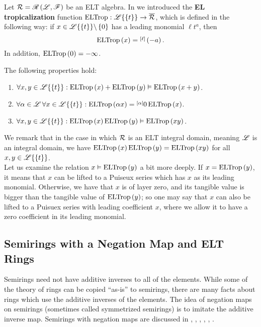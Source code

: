 Let $\mathcal{R}=\mathscr{R}\left(\mathscr{L},\mathscr{F}\right)$ be an ELT algebra. In \cite{BS} we introduced the \textbf{EL tropicalization} function $\textnormal{ELTrop}:\mathscr{L}\{\{t\}\}\rightarrow\overline{\mathcal{R}}$, which is defined in the following way: if $x\in \mathscr{L}\{\{t\}\}\backslash\left\{0\right\}$ has a leading monomial $\ell t^{a}$, then
$$\textnormal{ELTrop}\left(x\right)=\overset{\left[\ell\right]}{}\left(-a\right).$$
In addition, $\textnormal{ELTrop}\left(0\right)=-\infty$.

\begin{lem}[{\cite[Lemma 0.9]{BS}}]\label{lem:ELTrop-prop}
The following properties hold:
\begin{enumerate}
\item $\forall x,y\in\mathscr{L}\{\{t\}\}:\textnormal{ELTrop}\left(x\right)+\textnormal{ELTrop}\left(y\right)\vDash\textnormal{ELTrop}\left(x+y\right)$.
\item $\forall\alpha\in\mathscr{L}\,\forall x\in\mathscr{L}\{\{t\}\}:\textnormal{ELTrop}\left(\alpha x\right)=\overset{\left[\alpha\right]}{}0\, \textnormal{ELTrop}\left(x\right)$.
\item $\forall x,y\in\mathscr{L}\{\{t\}\}:\textnormal{ELTrop}\left(x\right)\textnormal{ELTrop}\left(y\right)\vDash\textnormal{ELTrop}\left(xy\right)$.
\end{enumerate}
\end{lem}
We remark that in the case in which $\mathcal{R}$ is an ELT integral domain, meaning $\mathscr{L}$ is an integral domain, we have $\textnormal{ELTrop}\left(x\right)\textnormal{ELTrop}\left(y\right)=\textnormal{ELTrop}\left(xy\right)$ for all $x,y\in\mathscr{L}\{\{t\}\}$. \\

Let us examine the relation $x\vDash\textnormal{ELTrop}\left(y\right)$ a bit more deeply. If $x=\textnormal{ELTrop}\left(y\right)$, it means that $x$ can be lifted to a Puiseux series which has $x$ as its leading monomial. Otherwise, we have that $x$ is of layer zero, and its tangible value is bigger than the tangible value of $\textnormal{ELTrop}\left(y\right)$; so one may say that $x$ can also be lifted to a Puisuex series with leading coefficient $x$, where we allow it to have a zero coefficient in its leading monomial.

\subsection{Semirings with a Negation Map and ELT Rings}\label{sub:ELT-symmetrized}

Semirings need not have additive inverses to all of the elements. While some of the theory of rings can be copied ``as-is'' to semirings, there are many facts about rings which use the additive inverses of the elements. The idea of negation maps on semirings (sometimes called symmetrized semirings) is to imitate the additive inverse map. Semirings with negation maps are discussed in \cite{Akian1990}, \cite{Gaubert1992}, \cite{Gaubert1997}, \cite{Akian2008}, \cite{Akian2014}, \cite{Rowen2016}.

